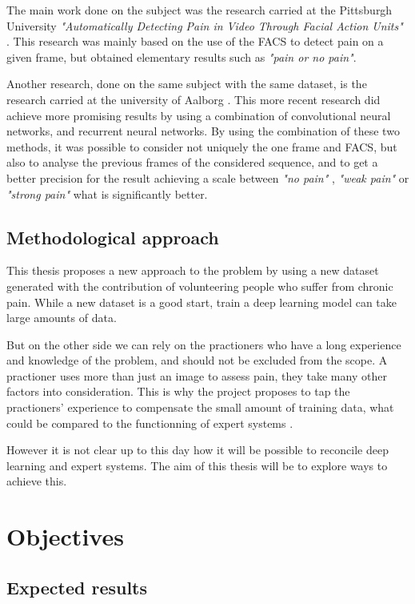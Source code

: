 \documentclass[11pt]{article}
\begin{document}
The main work done on the subject was the research carried at the  Pittsburgh
University \emph{"Automatically Detecting Pain in Video Through Facial Action
Units"} \cite{lucey2011automatically}. This research was mainly based on the
use of the FACS to detect pain on a given frame, but obtained elementary
results such as \emph{"pain or no pain"}.  

Another research, done on the same subject with the same dataset, is the
research carried at the university of Aalborg \cite{bellantonio2016spatio}.
This more recent research did achieve more promising results by using a
combination of convolutional neural networks, and recurrent neural networks.
By using the combination of these two methods, it was possible to consider
not uniquely the one frame and FACS, but also to analyse the previous frames
of the considered sequence, and to get a better precision for the result
achieving a scale between \emph{"no pain"} , \emph{"weak pain"} or \emph{"strong pain"} what
is significantly better.  

\subsection{Methodological approach}
\label{sec:orgc28aa75}
This thesis proposes a new approach to the problem by using a new dataset
generated with the contribution of volunteering people who suffer from
chronic pain. While a new dataset is a good start, train a deep learning
model can take large amounts of data.  

But on the other side we can rely on the practioners who have a long experience and
knowledge of the problem, and should not be excluded from the scope.
A practioner uses more than just an image to assess pain, they take many other
factors into consideration. This is why the project proposes to tap the
practioners' experience to compensate the small amount of training data, what
could be compared to the functionning of expert systems
\cite{giarratano1998expert}.

However it is not clear up to this day how it will be possible to reconcile deep
learning and expert systems. The aim of this thesis will be to explore ways
to achieve this.  


\section{Objectives}
\label{sec:org64d7903}
\subsection{Expected results}
\label{sec:org9fb423b}
\end{document}
